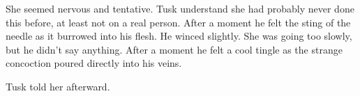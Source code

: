 
She seemed nervous and tentative. Tusk understand she had probably never done this before, at
least not on a real person. After a moment he felt the sting of the needle as it burrowed into
his flesh. He winced slightly. She was going too slowly, but he didn't say anything. After a
moment he felt a cool tingle as the strange concoction poured directly into his veins.

 Tusk told her afterward.

